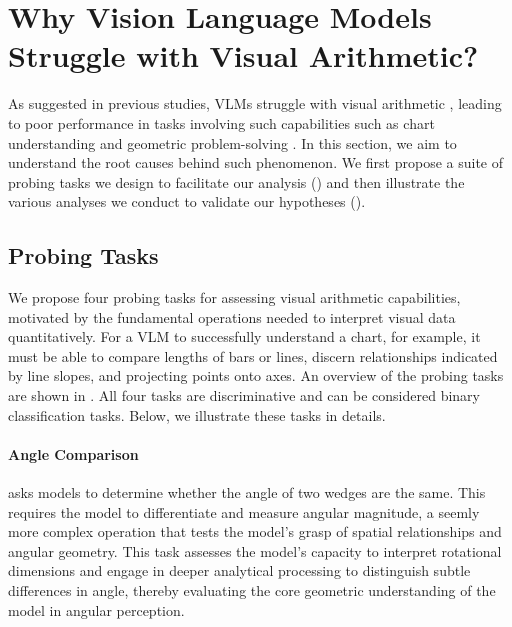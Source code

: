 \section{Why Vision Language Models Struggle with Visual Arithmetic?}
\label{sec:probing}
As suggested in previous studies, VLMs struggle with visual arithmetic \cite{Rahmanzadehgervi_2024_blind, wang2024vdlm}, leading to poor performance in tasks involving such capabilities such as chart understanding \cite{huang-etal-2024-lvlms} and geometric problem-solving \cite{gao2023gllava}. In this section, we aim to understand the root causes behind such phenomenon. We first propose a suite of probing tasks we design to facilitate our analysis () and then illustrate the various analyses we conduct to validate our hypotheses ().



\subsection{Probing Tasks}
\label{subsec:probing_tasks}

We propose four probing tasks for assessing visual arithmetic capabilities, motivated by the fundamental operations needed to interpret visual data quantitatively. For a VLM to successfully understand a chart, for example, it must be able to compare lengths of bars or lines, discern relationships indicated by line slopes, and projecting points onto axes. An overview of the probing tasks are shown in . All four tasks are discriminative and can be considered binary classification tasks.  %
Below, we illustrate these tasks in details.





\paragraph{Angle Comparison} asks models to determine whether the angle of two wedges are the same. This requires the model to differentiate and measure angular magnitude, a seemly more complex operation that tests the model's grasp of spatial relationships and angular geometry. This task assesses the model's capacity to interpret rotational dimensions and engage in deeper analytical processing to distinguish subtle differences in angle, thereby evaluating the core geometric understanding of the model in angular perception. %
\vspace{-2mm}
